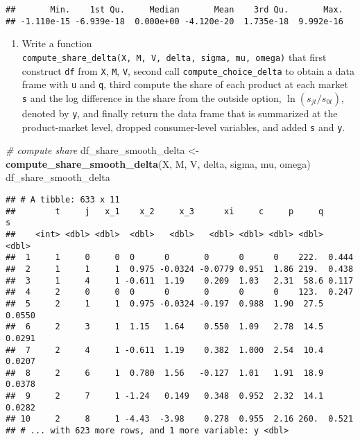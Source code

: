 \documentclass[
]{book}
\newenvironment{Shaded}{\begin{snugshade}}{\end{snugshade}}
\newcommand{\CommentTok}[1]{\textcolor[rgb]{0.56,0.35,0.01}{\textit{#1}}}
\newcommand{\KeywordTok}[1]{\textcolor[rgb]{0.13,0.29,0.53}{\textbf{#1}}}
\newcommand{\NormalTok}[1]{#1}
\newcommand{\StringTok}[1]{\textcolor[rgb]{0.31,0.60,0.02}{#1}}
\providecommand{\tightlist}{%
  \setlength{\itemsep}{0pt}\setlength{\parskip}{0pt}}
\begin{document}
\begin{verbatim}
##       Min.    1st Qu.     Median       Mean    3rd Qu.       Max. 
## -1.110e-15 -6.939e-18  0.000e+00 -4.120e-20  1.735e-18  9.992e-16
\end{verbatim}

\begin{enumerate}
\def\labelenumi{\arabic{enumi}.}
\setcounter{enumi}{6}
\tightlist
\item
  Write a function \texttt{compute\_share\_delta(X,\ M,\ V,\ delta,\ sigma,\ mu,\ omega)} that first construct \texttt{df} from \texttt{X}, \texttt{M}, \texttt{V}, second call \texttt{compute\_choice\_delta} to obtain a data frame with \texttt{u} and \texttt{q}, third compute the share of each product at each market \texttt{s} and the log difference in the share from the outside option, \(\ln(s_{jt}/s_{0t})\), denoted by \texttt{y}, and finally return the data frame that is summarized at the product-market level, dropped consumer-level variables, and added \texttt{s} and \texttt{y}.
\end{enumerate}

\begin{Shaded}
\begin{Highlighting}[]
\CommentTok{# compute share}
\NormalTok{df_share_smooth_delta <-}
\StringTok{  }\KeywordTok{compute_share_smooth_delta}\NormalTok{(X, M, V, delta, sigma, mu, omega) }
\NormalTok{df_share_smooth_delta}
\end{Highlighting}
\end{Shaded}

\begin{verbatim}
## # A tibble: 633 x 11
##        t     j   x_1    x_2     x_3      xi     c     p     q      s
##    <int> <dbl> <dbl>  <dbl>   <dbl>   <dbl> <dbl> <dbl> <dbl>  <dbl>
##  1     1     0     0  0      0       0      0      0    222.  0.444 
##  2     1     1     1  0.975 -0.0324 -0.0779 0.951  1.86 219.  0.438 
##  3     1     4     1 -0.611  1.19    0.209  1.03   2.31  58.6 0.117 
##  4     2     0     0  0      0       0      0      0    123.  0.247 
##  5     2     1     1  0.975 -0.0324 -0.197  0.988  1.90  27.5 0.0550
##  6     2     3     1  1.15   1.64    0.550  1.09   2.78  14.5 0.0291
##  7     2     4     1 -0.611  1.19    0.382  1.000  2.54  10.4 0.0207
##  8     2     6     1  0.780  1.56   -0.127  1.01   1.91  18.9 0.0378
##  9     2     7     1 -1.24   0.149   0.348  0.952  2.32  14.1 0.0282
## 10     2     8     1 -4.43  -3.98    0.278  0.955  2.16 260.  0.521 
## # ... with 623 more rows, and 1 more variable: y <dbl>
\end{verbatim}
\end{document}
